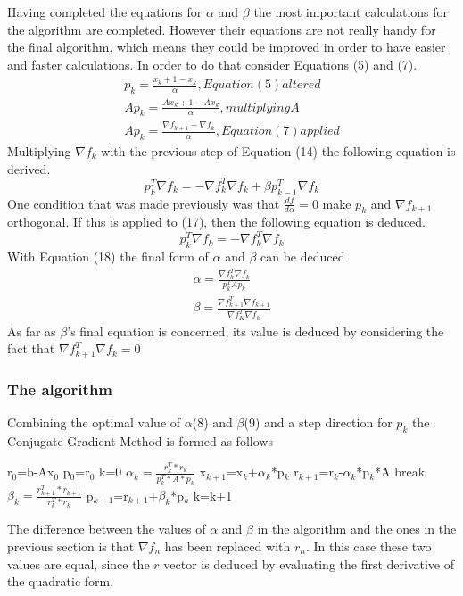 \documentclass[12pt,twosided]{article}
\begin{document}
Having completed the equations for $\alpha$ and $\beta$ the most important calculations for the algorithm are completed. However their equations are not really handy for the final algorithm, which means they could be improved in order to have easier and faster calculations. In order to do that consider Equations (5) and (7).
\begin{equation}
\begin{split}
p_k=\frac{x_k+1-x_k}{\alpha},Equation (5) altered\\
Ap_k=\frac{Ax_k+1-Ax_k}{\alpha}, multiplying A\\
Ap_k=\frac{\nabla f_{k+1}-\nabla f_k}{\alpha}, Equation (7) applied
\end{split}
\end{equation}
Multiplying $\nabla f_k$ with the previous step of Equation (14) the following equation is derived.
\begin{equation}
p_k^T\nabla f_k=-\nabla f_k^T\nabla f_k+\beta p_{k-1}^T\nabla f_k
\end{equation}
One condition that was made previously was that $\frac{df}{d\alpha}=0$ make $p_k$ and $\nabla f_{k+1}$ orthogonal. If this is applied to (17), then the following equation is deduced.
\begin{equation}
p_k^T\nabla f_k=-\nabla f_k^T\nabla f_k
\end{equation}
With Equation (18) the final form of $\alpha$ and $\beta$ can be deduced
\begin{equation}
\begin{split}
\alpha = \frac{\nabla f_k^T\nabla f_k}{p_k^TAp_k}\\
\beta=\frac{\nabla f_{k+1}^T\nabla f_{k+1}}{\nabla f_K^T\nabla f_k}
\end{split}
\end{equation}
As far as $\beta$'s final equation is concerned, its value is deduced by considering the fact that $\nabla f_{k+1}^T \nabla f_k=0$
\subsubsection{The algorithm}
Combining the optimal value of $\alpha$(8) and $\beta$(9) and a step direction for $p_k$ the Conjugate Gradient Method is formed as follows
\\
\begin{algorithmic}
\STATE r$_0$=b-Ax$_0$
\STATE p$_0$=r$_0$
\STATE k=0
\STATE $\alpha_k=\frac{r_k ^T*r_k}{p_k ^T*A*p_k}$
\STATE x$_{k+1}$=x$_k$+$\alpha_k$*p$_k$
\STATE r$_{k+1}$=r$_k$-$\alpha_k$*p$_k$*A
\STATE break
\ENDIF
\STATE $\beta_k=\frac{r_{k+1} ^T*r_{k+1}}{r_k ^T*r_k}$
\STATE p$_{k+1}$=r$_{k+1}$+$\beta_k$*p$_k$
\STATE k=k+1
\ENDFOR
\end{algorithmic}
\vspace{20pt}
The difference between the values of $\alpha$ and $\beta$ in the algorithm and the ones in the previous section is that $\nabla f_{n}$ has been replaced with $r_n$. In this case these two values are equal, since the $r$ vector is deduced by evaluating the first derivative of the quadratic form.
\end{document}
